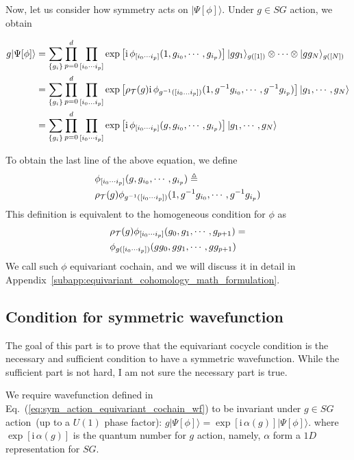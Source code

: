 \documentclass[%
  reprint,
  amsmath,amssymb,
  aps,pra,
]{revtex4-1}
\newcommand{\ii}{\mathrm{i}\,} %
\newcommand{\TT}{\mathcal{T}} %
\begin{document}
Now, let us consider how symmetry acts on $|\Psi[\phi]\rangle$.
Under $g\in SG$ action, we obtain
\begin{widetext}
  \begin{align}
    g|\Psi[\phi]\rangle&=\sum_{\{g_i\}}\prod_{p=0}^d \prod_{[i_0\cdots i_{p}]} \exp\left[ \ii \phi_{[i_0\cdots i_{p}]}(1,g_{i_0},\cdots,g_{i_{p}}) \right] |gg_1\rangle_{g([1])}\otimes\cdots\otimes|gg_N\rangle_{g([N])}\notag\\
    &=\sum_{\{g_i\}}\prod_{p=0}^d \prod_{[i_0\ldots i_{p}]} \exp\left[ \rho_{\TT}(g)\ii \phi_{g^{-1}([i_0\ldots i_{p}])}(1,g^{-1}g_{i_0},\cdots,g^{-1}g_{i_{p}}) \right] |g_1,\cdots,g_N\rangle\notag\\
    &=\sum_{\{g_i\}}\prod_{p=0}^d \prod_{[i_0\cdots i_{p}]} \exp\left[ \ii \phi_{[i_0\cdots i_{p}]}(g,g_{i_0},\cdots,g_{i_{p}}) \right] |g_1,\cdots,g_N\rangle
    \label{eq:sym_action_equivariant_cochain_wf}
  \end{align}
\end{widetext}
To obtain the last line of the above equation, we define
\begin{align}
  &\phi_{[i_0\cdots i_{p}]}(g,g_{i_0},\cdots,g_{i_{p}})\triangleq\notag\\
  &\rho_{\TT}(g) \phi_{g^{-1}([i_0\cdots i_{p}])}(1,g^{-1}g_{i_0},\cdots,g^{-1}g_{i_{p}})
  \label{}
\end{align}
This definition is equivalent to the homogeneous condition for $\phi$ as
\begin{align}
  &\rho_{\TT}(g)\phi_{[i_0\cdots i_{p}]}(g_0,g_1,\cdots,g_{p+1})=\notag\\
  &\phi_{g([i_0\cdots i_{p}])}(gg_0,gg_1,\cdots,gg_{p+1})
  \label{eq:equivariant_cochain_condition}
\end{align}
We call such $\phi$ equivariant cochain, and we will discuss it in detail in Appendix~\ref{subapp:equivariant_cohomology_math_formulation}.

\subsection{Condition for symmetric wavefunction}
{\color{red} The goal of this part is to prove that the equivariant cocycle condition is the necessary and sufficient condition to have a symmetric wavefunction. While the sufficient part is not hard, I am not sure the necessary part is true.}

We require wavefunction defined in Eq.~(\ref{eq:sym_action_equivariant_cochain_wf}) to be invariant under $g\in SG$ action~(up to a $U(1)$ phase factor): $g|\Psi[\phi]\rangle=\exp[\ii \alpha(g)]|\Psi[\phi]\rangle$. 
where $\exp[\ii\alpha(g)]$ is the quantum number for $g$ action, namely, $\alpha$ form a $1D$ representation for $SG$.
\end{document}
